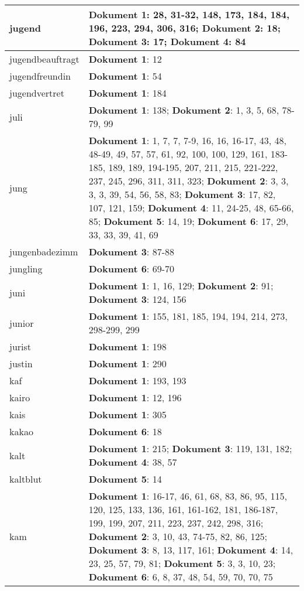\documentclass[a5paper]{article}
\begin{document}
\begin{longtable}[l]{|l|p{3in}|}
\hline
jugend & \textbf{Dokument 1}: 28, 31-32, 148, 173, 184, 184, 196, 223, 294, 306, 316; \textbf{Dokument 2}: 18; \textbf{Dokument 3}: 17; \textbf{Dokument 4}: 84 \\
\hline
jugendbeauftragt & \textbf{Dokument 1}: 12 \\
\hline
jugendfreundin & \textbf{Dokument 1}: 54 \\
\hline
jugendvertret & \textbf{Dokument 1}: 184 \\
\hline
juli & \textbf{Dokument 1}: 138; \textbf{Dokument 2}: 1, 3, 5, 68, 78-79, 99 \\
\hline
jung & \textbf{Dokument 1}: 1, 7, 7, 7-9, 16, 16, 16-17, 43, 48, 48-49, 49, 57, 57, 61, 92, 100, 100, 129, 161, 183-185, 189, 189, 194-195, 207, 211, 215, 221-222, 237, 245, 296, 311, 311, 323; \textbf{Dokument 2}: 3, 3, 3, 3, 39, 54, 56, 58, 83; \textbf{Dokument 3}: 17, 82, 107, 121, 159; \textbf{Dokument 4}: 11, 24-25, 48, 65-66, 85; \textbf{Dokument 5}: 14, 19; \textbf{Dokument 6}: 17, 29, 33, 33, 39, 41, 69 \\
\hline
jungenbadezimm & \textbf{Dokument 3}: 87-88 \\
\hline
jungling & \textbf{Dokument 6}: 69-70 \\
\hline
juni & \textbf{Dokument 1}: 1, 16, 129; \textbf{Dokument 2}: 91; \textbf{Dokument 3}: 124, 156 \\
\hline
junior & \textbf{Dokument 1}: 155, 181, 185, 194, 194, 214, 273, 298-299, 299 \\
\hline
jurist & \textbf{Dokument 1}: 198 \\
\hline
justin & \textbf{Dokument 1}: 290 \\
\hline
kaf & \textbf{Dokument 1}: 193, 193 \\
\hline
kairo & \textbf{Dokument 1}: 12, 196 \\
\hline
kais & \textbf{Dokument 1}: 305 \\
\hline
kakao & \textbf{Dokument 6}: 18 \\
\hline
kalt & \textbf{Dokument 1}: 215; \textbf{Dokument 3}: 119, 131, 182; \textbf{Dokument 4}: 38, 57 \\
\hline
kaltblut & \textbf{Dokument 5}: 14 \\
\hline
kam & \textbf{Dokument 1}: 16-17, 46, 61, 68, 83, 86, 95, 115, 120, 125, 133, 136, 161, 161-162, 181, 186-187, 199, 199, 207, 211, 223, 237, 242, 298, 316; \textbf{Dokument 2}: 3, 10, 43, 74-75, 82, 86, 125; \textbf{Dokument 3}: 8, 13, 117, 161; \textbf{Dokument 4}: 14, 23, 25, 57, 79, 81; \textbf{Dokument 5}: 3, 3, 10, 23; \textbf{Dokument 6}: 6, 8, 37, 48, 54, 59, 70, 70, 75 \\

\end{longtable}
\end{document}
